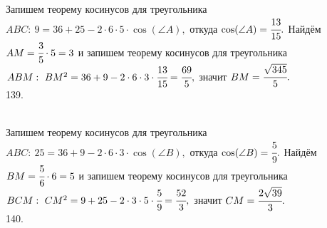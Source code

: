 \documentclass[12pt]{article}
\begin{document}
Запишем теорему косинусов для треугольника $ABC:\ 9=36+25-2\cdot6\cdot5\cdot\cos(\angle A),$ откуда $\cos(\angle A)=\cfrac{13}{15}.$ Найдём $AM=\cfrac{3}{5}\cdot5=3$ и запишем теорему косинусов для треугольника $ABM:\ BM^2=36+9-2\cdot6\cdot3\cdot\cfrac{13}{15}=\cfrac{69}{5},$ значит $BM=\cfrac{\sqrt{345}}{5}.$\\
139. \begin{figure}[ht!]
\end{figure}\\
Запишем теорему косинусов для треугольника $ABC:\ 25=36+9-2\cdot6\cdot3\cdot\cos(\angle B),$ откуда $\cos(\angle B)=\cfrac{5}{9}.$ Найдём $BM=\cfrac{5}{6}\cdot6=5$ и запишем теорему косинусов для треугольника $BCM:\ CM^2=9+25-2\cdot3\cdot5\cdot\cfrac{5}{9}=\cfrac{52}{3},$ значит $CM=\cfrac{2\sqrt{39}}{3}.$\\
140. \begin{figure}[ht!]
\end{figure}\\
\end{document}
